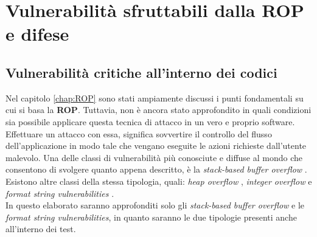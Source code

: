 \chapter{Vulnerabilità sfruttabili dalla ROP e difese}
\label{chap:ROP-vulnerabilities}

\section{Vulnerabilità critiche all'interno dei codici}
\label{sec:Vulnerabilita}
Nel capitolo \ref{chap:ROP} sono stati ampiamente discussi i punti fondamentali su cui si basa la \textbf{ROP}. Tuttavia, non è ancora stato approfondito in quali condizioni sia possibile applicare questa tecnica di attacco in un
vero e proprio software. Effettuare un attacco con essa, significa sovvertire il controllo del flusso dell'applicazione in modo tale che vengano eseguite le azioni richieste dall'utente malevolo. Una delle classi di vulnerabilità
più conosciute e diffuse al mondo che consentono di svolgere quanto appena descritto, è la \textit{stack-based buffer overflow} \cite*{Stack-bufferoverflow}\cite*{Stack-bufferoverflow2}. Esistono altre classi della stessa tipologia, quali: \textit{heap overflow} 
\cite*{Heapoverflow}\cite*{Heapoverflow-jpeg}, \textit{integer overflow} \cite*{Integeroverflow}\cite*{Integeroverflow2} e \textit{format string vulnerabilities} \cite*{Formatstring}\cite*{Formatstring2}.\\
In questo elaborato saranno approfonditi solo gli \textit{stack-based buffer overflow} e le \textit{format string vulnerabilities}, in quanto saranno le due tipologie presenti anche all'interno dei test.

